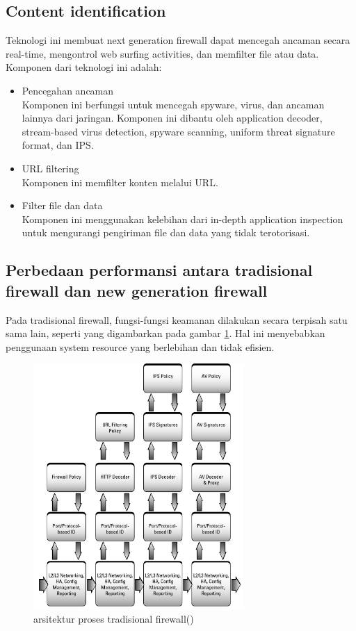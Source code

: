 \subsection{Content identification}
Teknologi ini membuat next generation firewall dapat mencegah ancaman secara real-time, mengontrol web surfing activities, dan memfilter file atau data. Komponen dari teknologi ini adalah:
\begin{itemize}
	\item Pencegahan ancaman\\
	Komponen ini berfungsi untuk mencegah spyware, virus, dan ancaman lainnya dari jaringan. Komponen ini dibantu oleh application decoder, stream-based virus detection, spyware scanning, uniform threat signature format, dan IPS.
	\item URL filtering\\
	Komponen ini memfilter konten melalui URL.
	\item Filter file dan data\\
	Komponen ini menggunakan kelebihan dari in-depth application inspection untuk mengurangi pengiriman file dan data yang tidak terotorisasi. 
\end{itemize}

\subsection{Perbedaan performansi antara tradisional firewall dan new generation firewall}
Pada tradisional firewall, fungsi-fungsi keamanan dilakukan secara terpisah satu sama lain, seperti yang digambarkan pada gambar \ref{fig:architecture_tradisional_firewall}. Hal ini menyebabkan penggunaan system resource yang berlebihan dan tidak efisien.
\begin{figure}[H]
	\centering
	\includegraphics[width=8cm]{resources/architecture_tradisional_firewall.png}
	\caption{arsitektur proses tradisional firewall(\cite{miller2011next})}
	\label{fig:architecture_tradisional_firewall}
\end{figure}

